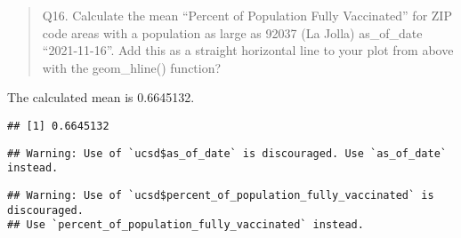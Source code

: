 \documentclass[
]{article}
\newenvironment{Shaded}{\begin{snugshade}}{\end{snugshade}}
\newcommand{\AttributeTok}[1]{\textcolor[rgb]{0.77,0.63,0.00}{#1}}
\newcommand{\DecValTok}[1]{\textcolor[rgb]{0.00,0.00,0.81}{#1}}
\newcommand{\FloatTok}[1]{\textcolor[rgb]{0.00,0.00,0.81}{#1}}
\newcommand{\FunctionTok}[1]{\textcolor[rgb]{0.00,0.00,0.00}{#1}}
\newcommand{\NormalTok}[1]{#1}
\newcommand{\OtherTok}[1]{\textcolor[rgb]{0.56,0.35,0.01}{#1}}
\newcommand{\SpecialCharTok}[1]{\textcolor[rgb]{0.00,0.00,0.00}{#1}}
\newcommand{\StringTok}[1]{\textcolor[rgb]{0.31,0.60,0.02}{#1}}
\begin{document}
\begin{quote}
Q16. Calculate the mean ``Percent of Population Fully Vaccinated'' for
ZIP code areas with a population as large as 92037 (La Jolla)
as\_of\_date ``2021-11-16''. Add this as a straight horizontal line to
your plot from above with the geom\_hline() function?
\end{quote}

The calculated mean is 0.6645132.

\begin{Shaded}
\end{Shaded}

\begin{verbatim}
## [1] 0.6645132
\end{verbatim}

\begin{Shaded}
\end{Shaded}

\begin{verbatim}
## Warning: Use of `ucsd$as_of_date` is discouraged. Use `as_of_date` instead.
\end{verbatim}

\begin{verbatim}
## Warning: Use of `ucsd$percent_of_population_fully_vaccinated` is discouraged.
## Use `percent_of_population_fully_vaccinated` instead.
\end{verbatim}
\end{document}
